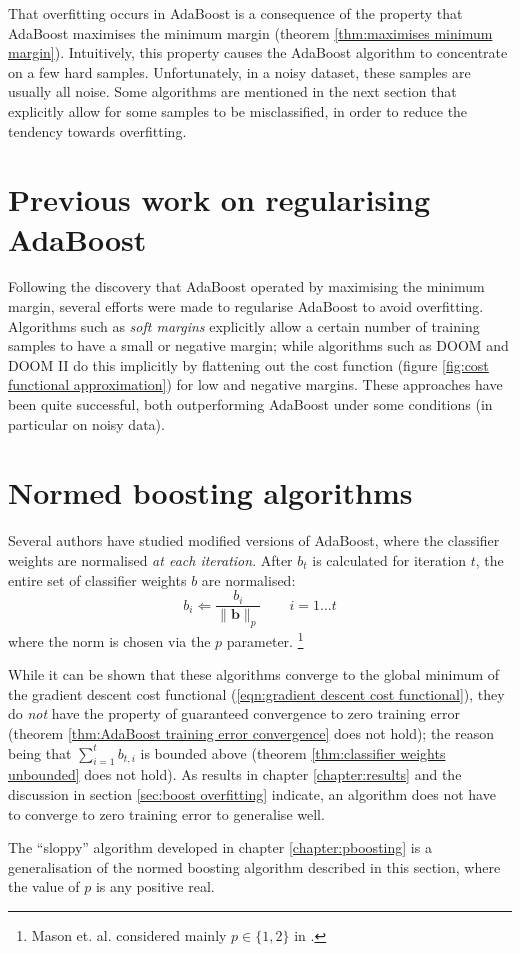 That overfitting occurs in AdaBoost is a consequence of the property
that AdaBoost maximises the minimum margin (theorem
\ref{thm:maximises minimum margin}).  Intuitively, this property
causes the  AdaBoost algorithm to concentrate on a few hard
samples.  Unfortunately, in a noisy dataset, these samples are usually
all noise.  Some algorithms are mentioned in the next section that
explicitly allow for some samples to be misclassified, in order to
reduce the tendency towards overfitting.

\section{Previous work on regularising AdaBoost}

Following the discovery that AdaBoost operated by maximising the
minimum margin, several efforts were made to regularise AdaBoost to
avoid overfitting.  Algorithms such as \emph{soft margins}
\cite{Ratsch98} explicitly allow a certain number of training samples
to have a small or negative margin; while algorithms such as DOOM and
DOOM II \cite{Mason99a, Mason99b} do this implicitly by flattening out
the cost function (figure \ref{fig:cost functional approximation}) for
low and negative margins.  These approaches have been quite
successful, both outperforming AdaBoost under some conditions (in
particular on noisy data).


\section{Normed boosting algorithms}

Several authors \cite{Mason99a, Breiman97} have studied modified
versions of AdaBoost, where the classifier weights are
normalised \emph{at each iteration}.  After $b_t$ is calculated for
iteration $t$, the entire set of classifier weights $b$ are
normalised:
%
\begin{equation}
b_{i} \Leftarrow \frac{b_i}{\| \mathbf{b} \|_p} \qquad  i=1
\ldots t
\end{equation}
%
where the norm is chosen via the $p$ parameter.%
\footnote{Mason et. al. considered mainly $p \in \{ 1,2 \}$ in
\cite{Mason99a}.}

While it can be shown that these algorithms converge to the global
minimum of the gradient descent cost functional (\ref{eqn:gradient
descent cost functional}), they do \emph{not} have the property of
guaranteed convergence to zero training error (theorem
\ref{thm:AdaBoost training error convergence} does not hold); the
reason being that  $\sum_{i=1}^t b_{t,i}$ is bounded above (theorem
\ref{thm:classifier weights unbounded} does not hold).  As results in
chapter \ref{chapter:results} and the discussion in section
\ref{sec:boost overfitting} indicate, an algorithm does not have to
converge to zero training error to generalise well.

The ``sloppy'' algorithm developed in chapter \ref{chapter:pboosting}
is a generalisation of the normed boosting algorithm described in this
section, where the value of $p$ is any positive real.





